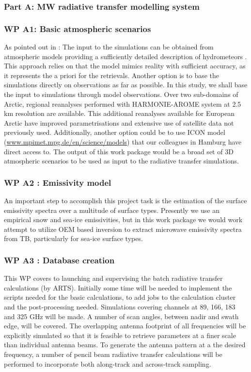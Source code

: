 \documentclass[12pt,oneside,a4paper]{article}
\begin{document}
\subsubsection{Part A: MW radiative transfer modelling system}

\subsubsection*{WP A1: Basic atmospheric scenarios}

As pointed out in \citet{eriksson:towar:20}: The input to the simulations can
be obtained from atmospheric models providing a sufficiently detailed
description of hydrometeors \citep[e.g.][]{wang2017statistical}. This approach
relies on that the model mimics reality with sufficient accuracy, as it
represents the a priori for the retrievals. Another option is to base the
simulations directly on observations as far as possible. In this study, we shall base the input to simulations through model observations. Over two sub-domains of Arctic, regional reanalyses performed with HARMONIE-AROME system at 2.5\,km resolution are available. This additional reanalyses available for European Arctic have improved parametrisations and extensive use of satellite data not previously used. Additionally, another option could be to use ICON model
(\url{www.mpimet.mpg.de/en/science/models}) that our colleagues in Hamburg have direct access to. 
The output of this work package would be a broad set of 3D atmospheric scenarios to be used as input to the radiative transfer simulations.

\subsubsection*{WP A2 : Emissivity model}

An important step to accomplish this project task is the estimation of the surface emissivity spectra over a multitude of surface types. Presently we use an empirical snow and sea-ice emissivities, but in this work package we would work attempt to utilize OEM based inversion to extract microwave emissivity spectra from TB, particularly for sea-ice surface types. 

	
\subsubsection*{WP A3 : Database creation}
%	
This WP covers to launching and supervising the batch radiative transfer calculations (by ARTS).
Initially some time will be needed to implement the scripts needed for the basic calculations,
to add jobs to the calculation cluster and the post-processing needed. Simulations covering channels at 89, 166, 183 and 325 GHz will be made. A number of scan angles, between nadir and swath edge, will be covered. The overlapping antenna footprint of all frequencies will be explicitly simulated so that it is feasible to retrieve parameters at a finer scale than individual antenna beams. To generate the antenna pattern at a the desired frequency, a number of pencil beam radiative transfer calculations will be performed to incorporate both along-track and across-track sampling.
 
\end{document}
